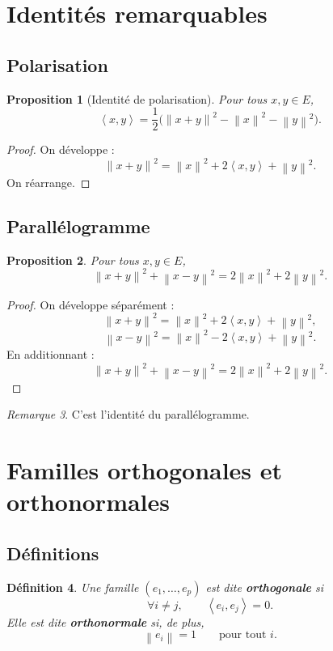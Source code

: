 \documentclass[11pt,a4paper]{article}
\newtheorem{definition}{Définition}[section]
\newtheorem{proposition}[definition]{Proposition}
\theoremstyle{remark}
\newtheorem{remarque}[definition]{Remarque}
\newcommand{\Norm}[1]{\left\|#1\right\|}
\newcommand{\scal}[2]{\left\langle #1,#2\right\rangle}
\begin{document}
\section{Identités remarquables}

\subsection{Polarisation}

\begin{proposition}[Identité de polarisation]
Pour tous \(x,y\in E\),
\[
\scal{x}{y}=\frac12\big(\Norm{x+y}^2-\Norm{x}^2-\Norm{y}^2\big).
\]
\end{proposition}

\begin{proof}
On développe :
\[
\Norm{x+y}^2=\Norm{x}^2+2\scal{x}{y}+\Norm{y}^2.
\]
On réarrange.
\end{proof}

\subsection{Parallélogramme}

\begin{proposition}
Pour tous \(x,y\in E\),
\[
\Norm{x+y}^2+\Norm{x-y}^2=2\Norm{x}^2+2\Norm{y}^2.
\]
\end{proposition}

\begin{proof}
On développe séparément :
\[
\Norm{x+y}^2=\Norm{x}^2+2\scal{x}{y}+\Norm{y}^2,
\]
\[
\Norm{x-y}^2=\Norm{x}^2-2\scal{x}{y}+\Norm{y}^2.
\]
En additionnant :
\[
\Norm{x+y}^2+\Norm{x-y}^2=2\Norm{x}^2+2\Norm{y}^2.
\]
\end{proof}

\begin{remarque}
C’est l’identité du parallélogramme.
\end{remarque}

\section{Familles orthogonales et orthonormales}

\subsection{Définitions}

\begin{definition}
Une famille \((e_1,\dots,e_p)\) est dite \textbf{orthogonale} si
\[
\forall i\neq j,\qquad \scal{e_i}{e_j}=0.
\]
Elle est dite \textbf{orthonormale} si, de plus,
\[
\Norm{e_i}=1
\qquad \text{pour tout } i.
\]
\end{definition}
\end{document}
